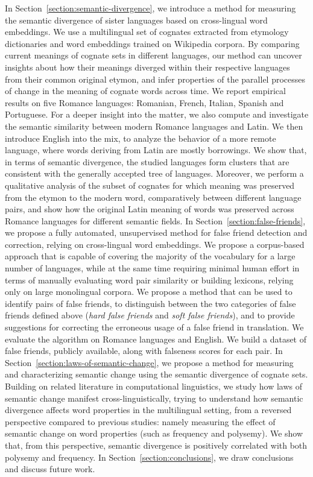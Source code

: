 \documentclass[output=paper]{langsci/langscibook}
\begin{document}
In Section~\ref{section:semantic-divergence}, we introduce a method for measuring the semantic divergence of sister languages based on cross-lingual word embeddings. We use a multilingual set of cognates extracted from etymology dictionaries and word embeddings trained on Wikipedia corpora. By comparing current meanings of cognate sets in different languages, our method can uncover insights about how their meanings diverged within their respective languages from their common original etymon, and infer properties of the parallel processes of change in the meaning of cognate words across time. We report empirical results on five Romance languages: Romanian, French, Italian, Spanish and Portuguese. For a deeper insight into the matter, we also compute and investigate the semantic similarity between modern Romance languages and Latin. We then introduce English into the mix, to analyze the behavior of a more remote language, where words deriving from Latin are mostly borrowings. We show that, in terms of semantic divergence, the studied languages form clusters that are consistent with the generally accepted tree of languages.
Moreover, we perform a qualitative analysis of the subset of cognates for which meaning was preserved from the etymon to the modern word, comparatively between different language pairs, and show how the original Latin meaning of words was preserved across Romance languages for different semantic fields. In Section~\ref{section:false-friends}, we propose a fully automated, unsupervised method for false friend detection and correction, relying on cross-lingual word embeddings. We propose a corpus-based approach that is capable of covering the majority of the vocabulary for a large number of languages, while at the same time requiring minimal human effort in terms of manually evaluating word pair similarity or building lexicons, relying only on large monolingual corpora.
We propose a method that can be used to identify pairs of false friends, to distinguish between the two categories of false friends defined above (\textit{hard false friends} and \textit{soft false friends}), and to provide suggestions for correcting the erroneous usage of a false friend in translation. We evaluate the algorithm on Romance languages and English. We build a dataset of false friends, publicly available, along with falseness scores for each pair.
In Section~\ref{section:laws-of-semantic-change}, we propose a method for measuring and characterizing semantic change using the semantic divergence of cognate sets. Building on related literature in computational linguistics, we study how laws of semantic change manifest cross-linguistically, trying to understand how semantic divergence affects word properties in the multilingual setting, from a reversed perspective compared to previous studies: namely measuring the effect of semantic change on word properties (such as frequency and polysemy). We show that, from this perspective, semantic divergence is positively correlated with both polysemy and frequency. 
In Section~\ref{section:conclusions}, we draw conclusions and discuss future work.
\end{document}
